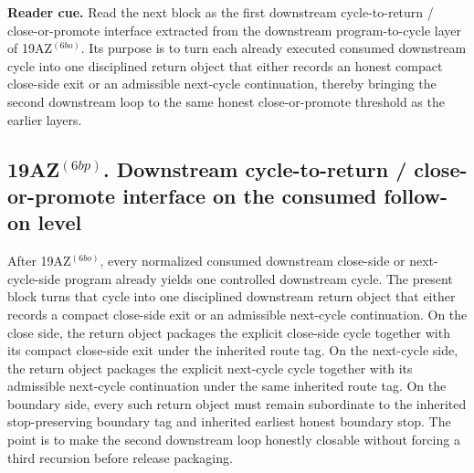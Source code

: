 \noindent\textbf{Reader cue.} Read the next block as the first downstream cycle-to-return / close-or-promote interface extracted from the downstream program-to-cycle layer of 19AZ$^{(6bo)}$. Its purpose is to turn each already executed consumed downstream cycle into one disciplined return object that either records an honest compact close-side exit or an admissible next-cycle continuation, thereby bringing the second downstream loop to the same honest close-or-promote threshold as the earlier layers.

\subsection*{19AZ$^{(6bp)}$. Downstream cycle-to-return / close-or-promote interface on the consumed follow-on level}
\label{sec:first-downstream-cycle-to-return-close-or-promote-interface-extracted-from-the-downstream-program-to-cycle-layer-on-the-consumed-follow-on-level}
After 19AZ$^{(6bo)}$, every normalized consumed downstream close-side or next-cycle-side program already yields one controlled downstream cycle. The present block turns that cycle into one disciplined downstream return object that either records a compact close-side exit or an admissible next-cycle continuation. On the close side, the return object packages the explicit close-side cycle together with its compact close-side exit under the inherited route tag. On the next-cycle side, the return object packages the explicit next-cycle cycle together with its admissible next-cycle continuation under the same inherited route tag. On the boundary side, every such return object must remain subordinate to the inherited stop-preserving boundary tag and inherited earliest honest boundary stop. The point is to make the second downstream loop honestly closable without forcing a third recursion before release packaging.

